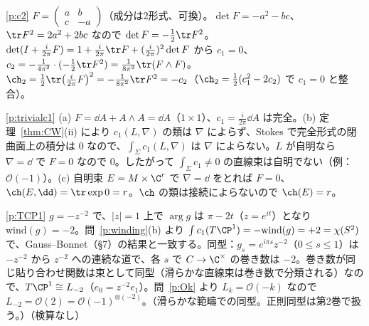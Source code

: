\begin{sol}{\ref{p:c2}}
$F=\begin{pmatrix}a&b\\c&-a\end{pmatrix}$（成分は2形式、可換）。$\det F=-a^2-bc$、$\tr F^2=2a^2+2bc$ なので $\det F=-\frac12\tr F^2$。$\det(I+\frac i{2\pi}F)=1+\frac i{2\pi}\tr F+(\frac i{2\pi})^2\det F$ から $c_1=0$、$c_2=-\frac1{4\pi^2}\cdot(-\frac12\tr F^2)=\frac1{8\pi^2}\tr(F\wedge F)$。$\ch_2=\frac12\tr\bigl(\frac i{2\pi}F\bigr)^2=-\frac1{8\pi^2}\tr F^2=-c_2$（$\ch_2=\frac12(c_1^2-2c_2)$ で $c_1=0$ と整合）。
\end{sol}
\begin{sol}{\ref{p:trivialc1}}
(a) $F=\dd A+A\wedge A=\dd A$（$1\times1$）、$c_1=\frac i{2\pi}\dd A$ は完全。(b) 定理~\ref{thm:CW}(ii) により $c_1(L,\nabla)$ の類は $\nabla$ によらず、Stokes で完全形式の閉曲面上の積分は $0$ なので、$\int_\Sigma c_1(L,\nabla)$ は $\nabla$ によらない。$L$ が自明なら $\nabla=\dd$ で $F=0$ なので $0$。したがって $\int_\Sigma c_1\ne0$ の直線束は自明でない（例：$\mathcal O(-1)$）。(c) 自明束 $E=M\times\C^r$ で $\nabla=\dd$ をとれば $F=0$、$\ch(E,\dd)=\tr\exp0=r$。$\ch$ の類は接続によらないので $\ch(E)=r$。
\end{sol}
\begin{sol}{\ref{p:TCP1}}
$g=-z^{-2}$ で、$|z|=1$ 上で $\arg g$ は $\pi-2t$（$z=e^{it}$）となり $\mathrm{wind}(g)=-2$。問~\ref{p:winding}(b) より $\int c_1(T\CP^1)=-\mathrm{wind}(g)=+2=\chi(S^2)$ で、Gauss--Bonnet（§7）の結果と一致する。同型：$g_s=e^{i\pi s}z^{-2}$（$0\le s\le1$）は $-z^{-2}$ から $z^{-2}$ への連続な道で、各 $s$ で $C\to\C^\times$ の巻き数は $-2$。巻き数が同じ貼り合わせ関数は束として同型（滑らかな直線束は巻き数で分類される\tC）なので、$T\CP^1\cong L_{-2}$（$e_0=z^{-2}e_1$）。問~\ref{p:Ok} より $L_k=\mathcal O(-k)$ なので $L_{-2}=\mathcal O(2)=\mathcal O(-1)^{\otimes(-2)}$。（滑らかな範疇での同型。正則同型は第2巻で扱う。）（検算なし）
\end{sol}
